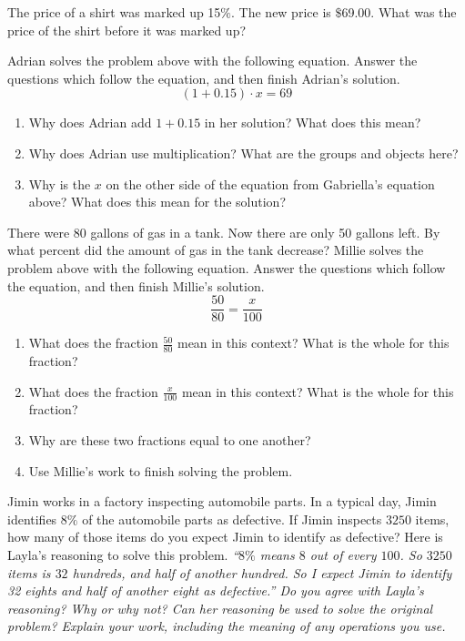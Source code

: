 \documentclass[noauthor,nooutcomes]{ximera}
\begin{document}
\begin{problem}
The price of a shirt was marked up 15$\%$.  The new price is $\$$69.00.  What was the price of the shirt before it was marked up?

\vskip 0.1in

Adrian solves the problem above with the following equation. Answer the questions which follow the equation, and then finish Adrian's solution.
\[
(1+0.15)\cdot x = 69
\]
\begin{enumerate}
	\item Why does Adrian add $1+0.15$ in her solution? What does this mean?
	\item Why does Adrian use multiplication? What are the groups and objects here?
	\item Why is the $x$ on the other side of the equation from Gabriella's equation above? What does this mean for the solution?
\end{enumerate}

\end{problem}



\begin{problem}
There were 80 gallons of gas in a tank.  Now there are only 50 gallons left.  By what percent did the amount of gas in the tank decrease?  
\vskip 0.1in
Millie solves the problem above with the following equation. Answer the questions which follow the equation, and then finish Millie's solution.
\[
\frac{50}{80} = \frac{x}{100}
\]
\begin{enumerate}
	\item What does the fraction $\frac{50}{80}$ mean in this context? What is the whole for this fraction?
	\item What does the fraction $\frac{x}{100}$ mean in this context? What is the whole for this fraction?
	\item Why are these two fractions equal to one another?
	\item Use Millie's work to finish solving the problem.
\end{enumerate}


\end{problem}



\begin{problem}
Jimin works in a factory inspecting automobile parts. In a typical day, Jimin identifies $8\%$ of the automobile parts as defective. If Jimin inspects $3250$ items, how many of those items do you expect Jimin to identify as defective?
\vskip 0.1in
Here is Layla's reasoning to solve this problem. \em{``$8\%$ means $8$ out of every $100$. So $3250$ items is $32$ hundreds, and half of another hundred. So I expect Jimin to identify 32 eights and half of another eight as defective.''}
\vskip 0.1in
Do you agree with Layla's reasoning? Why or why not? Can her reasoning be used to solve the original problem? Explain your work, including the meaning of any operations you use.

\end{problem}
\end{document}
